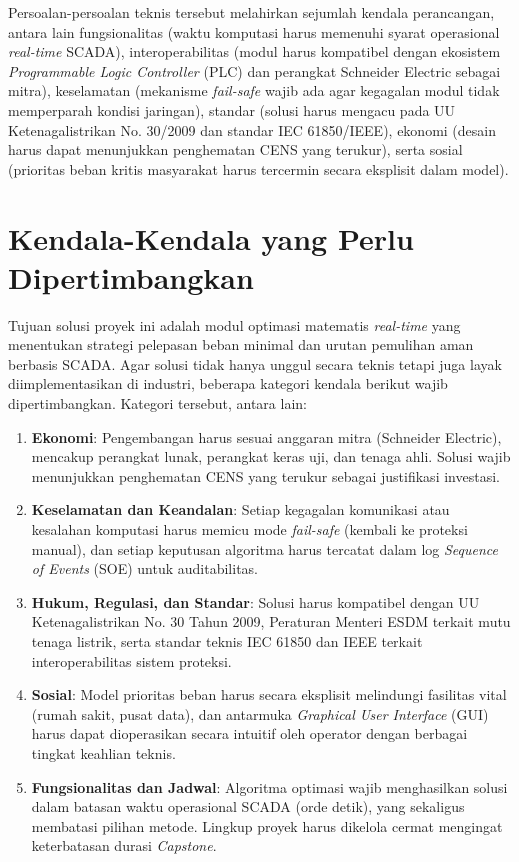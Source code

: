 Persoalan-persoalan teknis tersebut melahirkan sejumlah kendala perancangan, antara lain fungsionalitas (waktu komputasi harus memenuhi syarat operasional \textit{real-time} SCADA), interoperabilitas (modul harus kompatibel dengan ekosistem \textit{Programmable Logic Controller} (PLC) dan perangkat Schneider Electric sebagai mitra), keselamatan (mekanisme \textit{fail-safe} wajib ada agar kegagalan modul tidak memperparah kondisi jaringan), standar (solusi harus mengacu pada UU Ketenagalistrikan No. 30/2009 dan standar IEC 61850/IEEE), ekonomi (desain harus dapat menunjukkan penghematan CENS yang terukur), serta sosial (prioritas beban kritis masyarakat harus tercermin secara eksplisit dalam model).

\section{Kendala-Kendala yang Perlu Dipertimbangkan}
\label{sec:Kendala_Kendala_yang_Perlu_Dipertimbangkan}

Tujuan solusi proyek ini adalah modul optimasi matematis \textit{real-time} yang menentukan strategi pelepasan beban minimal dan urutan pemulihan aman berbasis SCADA. Agar solusi tidak hanya unggul secara teknis tetapi juga layak diimplementasikan di industri, beberapa kategori kendala berikut wajib dipertimbangkan. Kategori tersebut, antara lain:

\begin{enumerate}
    \item[a.] \textbf{Ekonomi}: Pengembangan harus sesuai anggaran mitra (Schneider Electric), mencakup perangkat lunak, perangkat keras uji, dan tenaga ahli. Solusi wajib menunjukkan penghematan CENS yang terukur sebagai justifikasi investasi.
    \item[b.] \textbf{Keselamatan dan Keandalan}: Setiap kegagalan komunikasi atau kesalahan komputasi harus memicu mode \textit{fail-safe} (kembali ke proteksi manual), dan setiap keputusan algoritma harus tercatat dalam log \textit{Sequence of Events} (SOE) untuk auditabilitas.
    \item[c.] \textbf{Hukum, Regulasi, dan Standar}: Solusi harus kompatibel dengan UU Ketenagalistrikan No. 30 Tahun 2009, Peraturan Menteri ESDM terkait mutu tenaga listrik, serta standar teknis IEC 61850 dan IEEE terkait interoperabilitas sistem proteksi.
    \item[d.] \textbf{Sosial}: Model prioritas beban harus secara eksplisit melindungi fasilitas vital (rumah sakit, pusat data), dan antarmuka \textit{Graphical User Interface} (GUI) harus dapat dioperasikan secara intuitif oleh operator dengan berbagai tingkat keahlian teknis.
    \item[e.] \textbf{Fungsionalitas dan Jadwal}: Algoritma optimasi wajib menghasilkan solusi dalam batasan waktu operasional SCADA (orde detik), yang sekaligus membatasi pilihan metode. Lingkup proyek harus dikelola cermat mengingat keterbatasan durasi \textit{Capstone}.
\end{enumerate}

